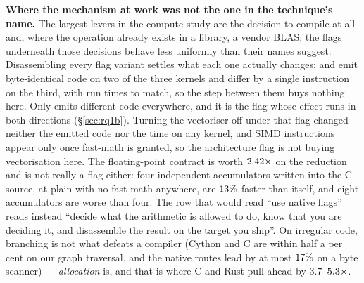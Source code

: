 \textbf{Where the mechanism at work was not the one in the technique's name.} The largest levers in the compute
study are the decision to compile at all and, where the operation already exists in a library,
a vendor BLAS; the flags underneath those decisions
behave less uniformly than their names suggest. Disassembling every flag variant settles what
each one actually changes:  and  emit byte-identical code on two of the
three kernels and differ by a single instruction on the third, with run times to match, so the
step between them buys nothing here. Only  emits different code
everywhere, and it is the flag whose effect runs in both directions (\S\ref{sec:rq1b}).
Turning the vectoriser off under that flag changed neither the emitted code nor
the time on any kernel, and SIMD instructions appear only once fast-math is granted, so the
architecture flag is not buying vectorisation here. The floating-point contract is worth
$\meas{ratio:b1_flags-314:arraysum/O3native|b1_flags-314:arraysum/O3native_ffast}{2.42}\times$ on the reduction and is not really a flag either: four independent accumulators
written into the C source, at plain  with no fast-math anywhere, are $\meas{pct:b1_flags-314:arraysum/O3native_ffast|b1_flags-314:arraysum/accum_acc4}{13}\%$ faster than
 itself, and eight accumulators are worse than four. The row that would read
``use native flags'' reads instead ``decide what the arithmetic is allowed to do, know that you
are deciding it, and disassemble the result on the target you ship''. On irregular code,
branching is not what defeats a compiler (Cython and C are within half a per cent on our graph
traversal, and the native routes lead by at most $\meas{pct:b2_branchy-314:tokenize/codon_jit|b2_branchy-314:tokenize/c_ctypes}{17}\%$ on a byte scanner) ---
\emph{allocation} is, and that is where C and Rust pull ahead by $3.7$--$\meas{ratio:b2_branchy-314:binarytrees/numba|b2_branchy-314:binarytrees/rust_ctypes}{5.3}\times$.

